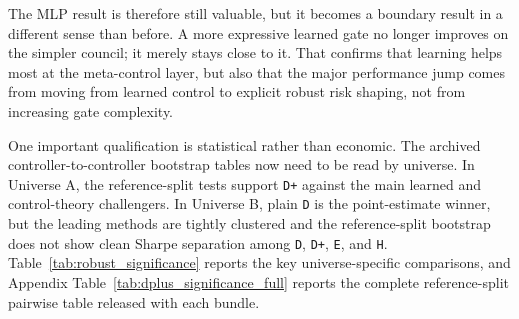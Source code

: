 \documentclass[10pt,twocolumn]{article}
\begin{document}
The MLP result is therefore still valuable, but it becomes a boundary result in
a different sense than before. A more expressive learned gate no longer
improves on the simpler council; it merely stays close to it. That confirms
that learning helps most at the meta-control layer, but also that the major
performance jump comes from moving from learned control to explicit robust risk
shaping, not from increasing gate complexity.

One important qualification is statistical rather than economic. The archived
controller-to-controller bootstrap tables now need to be read by universe. In
Universe A, the reference-split tests support \texttt{D+} against the main
learned and control-theory challengers. In Universe B, plain \texttt{D} is the
point-estimate winner, but the leading methods are tightly clustered and the
reference-split bootstrap does not show clean Sharpe separation among
\texttt{D}, \texttt{D+}, \texttt{E}, and \texttt{H}. Table~\ref{tab:robust_significance}
reports the key universe-specific comparisons, and Appendix
Table~\ref{tab:dplus_significance_full} reports the complete reference-split
pairwise table released with each bundle.

\begin{table}[t]
\centering
\small
\caption{Reference-split Sharpe deltas for the universe-specific robust winner
against key challengers under the cached block-bootstrap evaluation.}
\label{tab:robust_significance}
\end{table}
\end{document}
